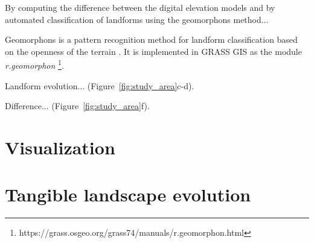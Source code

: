 \documentclass[final,3p,times,twocolumn]{elsarticle}
\begin{document}

By computing the difference between the digital elevation models
and by automated classification of landforms using
the geomorphons method...


Geomorphons is 
a pattern recognition method for landform classification 
based on the openness of the terrain \citep{Jasiewicz2013}.
It is implemented in GRASS GIS as the module \textit{r.geomorphon}
\footnote{https://grass.osgeo.org/grass74/manuals/r.geomorphon.html}.




%
%



Landform evolution...
(Figure~\ref{fig:study_area}c-d). 


Difference...
(Figure~\ref{fig:study_area}f).













\clearpage
\section{Visualization}

\section{Tangible landscape evolution}
\end{document}
